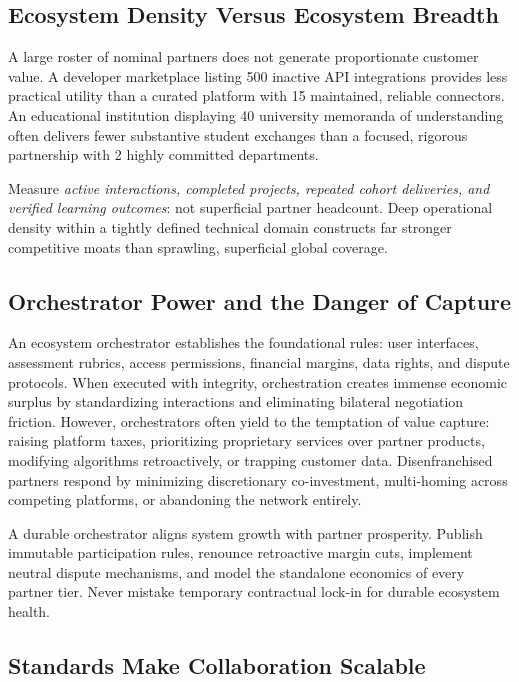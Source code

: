\subsection{Ecosystem Density Versus Ecosystem Breadth}
\label{sec:ecosystem_density_versus_breadth}

A large roster of nominal partners does not generate proportionate customer value. A developer marketplace listing 500 inactive API integrations provides less practical utility than a curated platform with 15 maintained, reliable connectors. An educational institution displaying 40 university memoranda of understanding often delivers fewer substantive student exchanges than a focused, rigorous partnership with 2 highly committed departments.

Measure \textit{active interactions, completed projects, repeated cohort deliveries, and verified learning outcomes}: not superficial partner headcount. Deep operational density within a tightly defined technical domain constructs far stronger competitive moats than sprawling, superficial global coverage.

\subsection{Orchestrator Power and the Danger of Capture}
\label{sec:orchestrator_power_and_capture}

An ecosystem orchestrator establishes the foundational rules: user interfaces, assessment rubrics, access permissions, financial margins, data rights, and dispute protocols. When executed with integrity, orchestration creates immense economic surplus by standardizing interactions and eliminating bilateral negotiation friction. However, orchestrators often yield to the temptation of value capture: raising platform taxes, prioritizing proprietary services over partner products, modifying algorithms retroactively, or trapping customer data. Disenfranchised partners respond by minimizing discretionary co-investment, multi-homing across competing platforms, or abandoning the network entirely.

A durable orchestrator aligns system growth with partner prosperity. Publish immutable participation rules, renounce retroactive margin cuts, implement neutral dispute mechanisms, and model the standalone economics of every partner tier. Never mistake temporary contractual lock-in for durable ecosystem health.

\subsection{Standards Make Collaboration Scalable}
\label{sec:standards_scale_collaboration}

